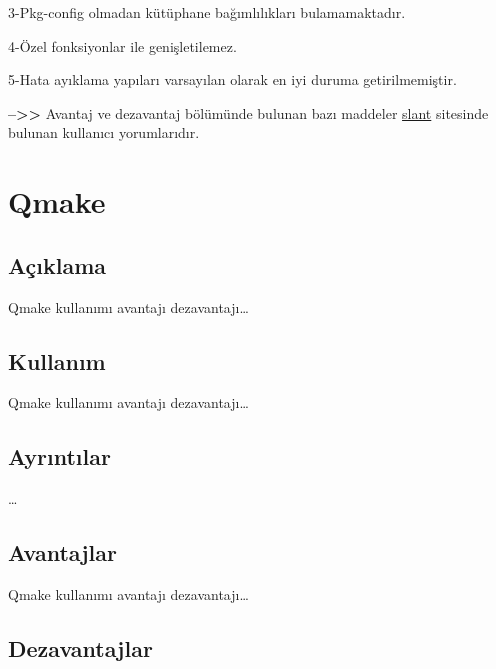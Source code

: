 \documentclass[
]{book}
\begin{document}
3-Pkg-config olmadan kütüphane bağımlılıkları bulamamaktadır.

4-Özel fonksiyonlar ile genişletilemez.

5-Hata ayıklama yapıları varsayılan olarak en iyi duruma getirilmemiştir.

\textbf{--\textgreater\textgreater{}} Avantaj ve dezavantaj bölümünde bulunan bazı maddeler \href{https://www.slant.co/topics/4263/viewpoints/14/~open-source-build-systems-for-c-c~meson}{slant} sitesinde bulunan kullanıcı yorumlarıdır.

\hypertarget{qmake}{%
\chapter*{Qmake}\label{qmake}}

\hypertarget{auxe7ux131klama-6}{%
\section*{Açıklama}\label{auxe7ux131klama-6}}

Qmake kullanımı avantajı dezavantajı\ldots{}

\hypertarget{kullanux131m-5}{%
\section*{Kullanım}\label{kullanux131m-5}}

Qmake kullanımı avantajı dezavantajı\ldots{}

\hypertarget{ayrux131ntux131lar-5}{%
\section*{Ayrıntılar}\label{ayrux131ntux131lar-5}}

\ldots{}

\hypertarget{avantajlar-5}{%
\section*{Avantajlar}\label{avantajlar-5}}

Qmake kullanımı avantajı dezavantajı\ldots{}

\hypertarget{dezavantajlar-5}{%
\section*{Dezavantajlar}\label{dezavantajlar-5}}
\end{document}
